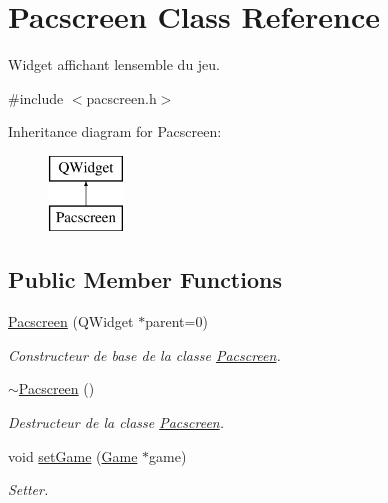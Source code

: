 \hypertarget{class_pacscreen}{}\section{Pacscreen Class Reference}
\label{class_pacscreen}


Widget affichant l\textquotesingle{}ensemble du jeu.  




{\ttfamily \#include $<$pacscreen.\+h$>$}

Inheritance diagram for Pacscreen\+:\begin{figure}[H]
\begin{center}
\leavevmode
\includegraphics[height=2.000000cm]{class_pacscreen}
\end{center}
\end{figure}
\subsection*{Public Member Functions}
\begin{DoxyCompactItemize}
\item 
\hyperlink{class_pacscreen_a8dfe2adcf7e11f715664859db16c6710}{Pacscreen} (Q\+Widget $\ast$parent=0)
\begin{DoxyCompactList}\small\item\em Constructeur de base de la classe \hyperlink{class_pacscreen}{Pacscreen}. \end{DoxyCompactList}\item 
\hypertarget{class_pacscreen_a4c4bd0bef62cc02bd3798b4d20cd765f}{}\hyperlink{class_pacscreen_a4c4bd0bef62cc02bd3798b4d20cd765f}{$\sim$\+Pacscreen} ()\label{class_pacscreen_a4c4bd0bef62cc02bd3798b4d20cd765f}

\begin{DoxyCompactList}\small\item\em Destructeur de la classe \hyperlink{class_pacscreen}{Pacscreen}. \end{DoxyCompactList}\item 
void \hyperlink{class_pacscreen_a6860cefac4b539818d5d78ace3f61b18}{set\+Game} (\hyperlink{class_game}{Game} $\ast$game)
\begin{DoxyCompactList}\small\item\em Setter. \end{DoxyCompactList}\end{DoxyCompactItemize}
